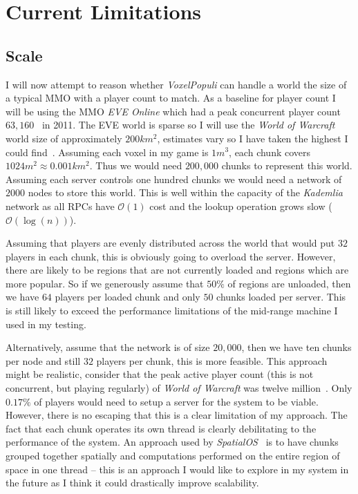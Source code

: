 \documentclass[12pt,notitlepage,a4paper]{report}
\newcommand{\kademlia}{\emph{Kademlia}}
\newcommand{\voxpop}{\emph{VoxelPopuli}}
\begin{document}
	\section{Current Limitations}
	\label{sec:limits}
	\subsection{Scale}
	I will now attempt to reason whether \voxpop{} can handle a world the size of a typical MMO with a player count to match. As a baseline for player count I will be using the MMO \emph{EVE Online} which had a peak concurrent player count $63,160$~\cite{eve} in 2011. The EVE world is sparse so I will use the \emph{World of Warcraft} world size of approximately $200km^2$, estimates vary so I have taken the highest I could find~\cite{wowsize}. Assuming each voxel in my game is $1m^3$, each chunk covers $1024m^2 \approx 0.001km^2$. Thus we would need $200,000$ chunks to represent this world. Assuming each server controls one hundred chunks we would need a network of $2000$ nodes to store this world. This is well within the capacity of the \kademlia{} network as all RPCs have $\mathcal{O}(1)$ cost and the lookup operation grows slow ($\mathcal{O}(\log(n))$).
	
	Assuming that players are evenly distributed across the world that would put $32$ players in each chunk, this is obviously going to overload the server. However, there are likely to be regions that are not currently loaded and regions which are more popular. So if we generously assume that $50\%$ of regions are unloaded, then we have $64$ players per loaded chunk and only $50$ chunks loaded per server. This is still likely to exceed the performance limitations of the mid-range machine I used in my testing.
	
	Alternatively, assume that the network is of size $20,000$, then we have ten chunks per node and still $32$ players per chunk, this is more feasible. This approach might be realistic, consider that the peak active player count (this is not concurrent, but playing regularly) of \emph{World of Warcraft} was twelve million~\cite{wowbig}. Only $0.17\%$ of players would need to setup a server for the system to be viable. However, there is no escaping that this is a clear limitation of my approach. The fact that each chunk operates its own thread is clearly debilitating to the performance of the system. An approach used by \emph{SpatialOS}~\cite{SpatialOS} is to have chunks grouped together spatially and computations performed on the entire region of space in one thread -- this is an approach I would like to explore in my system in the future as I think it could drastically improve scalability.
	
\end{document}
